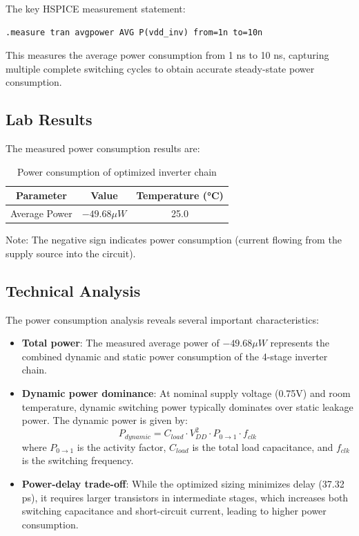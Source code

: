 \documentclass[UTF8,12pt,a4paper]{ctexart}
\begin{document}
The key HSPICE measurement statement:

\begin{lstlisting}
.measure tran avgpower AVG P(vdd_inv) from=1n to=10n
\end{lstlisting}

This measures the average power consumption from 1 ns to 10 ns, capturing multiple complete switching cycles to obtain accurate steady-state power consumption.

\subsection{Lab Results}

The measured power consumption results are:

\begin{table}[h]
\centering
\begin{tabular}{ccc}
\toprule
\textbf{Parameter} & \textbf{Value} & \textbf{Temperature (°C)} \\
\midrule
Average Power & $-49.68 \mu W$ & 25.0 \\
\bottomrule
\end{tabular}
\caption{Power consumption of optimized inverter chain}
\end{table}

Note: The negative sign indicates power consumption (current flowing from the supply source into the circuit).

\subsection{Technical Analysis}

The power consumption analysis reveals several important characteristics:

\begin{itemize}
    \item[1.] \textbf{Total power}: The measured average power of $-49.68 \mu W$ represents the combined dynamic and static power consumption of the 4-stage inverter chain.
    
    \item[2.] \textbf{Dynamic power dominance}: At nominal supply voltage (0.75V) and room temperature, dynamic switching power typically dominates over static leakage power. The dynamic power is given by:
    $$P_{dynamic} = C_{load} \cdot V_{DD}^2 \cdot P_{0 \rightarrow 1} \cdot f_{clk}$$
    where $P_{0 \rightarrow 1}$ is the activity factor, $C_{load}$ is the total load capacitance, and $f_{clk}$ is the switching frequency.
    
    \item[3.] \textbf{Power-delay trade-off}: While the optimized sizing minimizes delay (37.32 ps), it requires larger transistors in intermediate stages, which increases both switching capacitance and short-circuit current, leading to higher power consumption.
\end{itemize}
\end{document}
